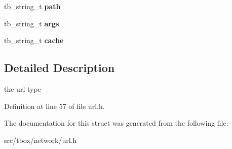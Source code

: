 \begin{DoxyCompactItemize}
\item 
\hypertarget{structtb__url__t_a56c2520231cbc0f551c2f35a3e2b1744}{tb\-\_\-string\-\_\-t {\bfseries path}}\label{structtb__url__t_a56c2520231cbc0f551c2f35a3e2b1744}

\item 
\hypertarget{structtb__url__t_a516f0970f34a94d7567b4b0bf127545b}{tb\-\_\-string\-\_\-t {\bfseries args}}\label{structtb__url__t_a516f0970f34a94d7567b4b0bf127545b}

\item 
\hypertarget{structtb__url__t_a42a093e51d95dc7fefd80bfe294586f1}{tb\-\_\-string\-\_\-t {\bfseries cache}}\label{structtb__url__t_a42a093e51d95dc7fefd80bfe294586f1}

\end{DoxyCompactItemize}


\subsection{Detailed Description}
the url type 

Definition at line 57 of file url.\-h.



The documentation for this struct was generated from the following file\-:\begin{DoxyCompactItemize}
\item 
src/tbox/network/url.\-h\end{DoxyCompactItemize}
